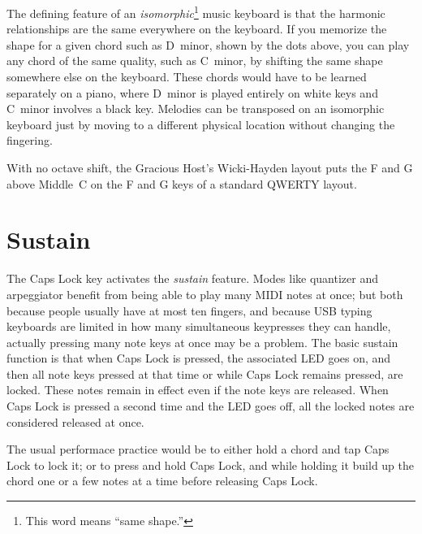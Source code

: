 The defining feature of an \emph{isomorphic}\footnote{This word means ``same
shape.''} music keyboard is that the harmonic relationships are the same
everywhere on the keyboard.  If you memorize the shape for a given chord
such as D~minor, shown by the dots above, you can play any chord of the same
quality, such as C~minor, by shifting the same shape somewhere else on the
keyboard.  These chords would have to be learned separately on a piano,
where D~minor is played entirely on white keys and C~minor involves a black
key.  Melodies can be transposed on an isomorphic keyboard just by moving to
a different physical location without changing the fingering.

With no octave shift, the Gracious Host's Wicki-Hayden layout puts the F
and G above Middle~C on the F and G keys of a standard QWERTY layout.


\section{Sustain}

The Caps Lock key activates the \emph{sustain} feature.  Modes like
quantizer and arpeggiator benefit from being able to play many MIDI notes at
once; but both because people usually have at most ten fingers, and because
USB typing keyboards are limited in how many simultaneous keypresses they
can handle, actually pressing many note keys at once may be a problem.  The
basic sustain function is that when Caps Lock is pressed, the associated LED
goes on, and then all note keys pressed at that time or while Caps Lock
remains pressed, are locked.  These notes remain in effect even if the note
keys are released.  When Caps Lock is pressed a second time and the LED goes
off, all the locked notes are considered released at once.

The usual performace practice would be to either hold a chord and tap
Caps Lock to lock it; or to press and hold Caps Lock, and while holding it
build up the chord one or a few notes at a time before releasing Caps Lock.

